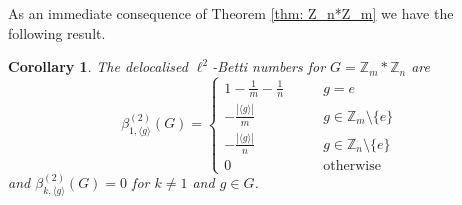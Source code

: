 \documentclass[a4paper,leqno,12pt]{article}
\numberwithin{equation}{section}
\theoremstyle{plain}
\newtheorem{corollary}[theoremcounter]{Corollary}
\newtheorem{lemma}[theoremcounter]{Lemma}
\newtheorem{question}[theoremcounter]{Question}
\theoremstyle{definition}
\theoremstyle{remark}
\newcommand{\Csr}{\mathrm{C}^*_{\text{red}}}
\begin{document}
%	

	As an immediate consequence of Theorem \ref{thm: Z_n*Z_m} we have the following result. 
	
	\begin{corollary} \label{cor: deloc l2 Betti Zn*Zm}
		The delocalised $\ell^2$-Betti numbers for $G = \mathbb Z_m \ast \mathbb Z_n $ are
		\begin{equation*}
			\beta^{(2)}_{1, \langle{g}\rangle}(G) = 
			\begin{cases}
				1-\frac{1}{m}-\frac{1}{n} &\qquad g=e\\
				-\frac{|\langle{g}\rangle|}{m}  &\qquad g \in \mathbb Z_m \setminus \{e\}\\
				-\frac{|\langle{g}\rangle|}{n}  &\qquad g \in \mathbb Z_n \setminus \{e\}\\
				0 \qquad & \qquad  \text{otherwise} 
			\end{cases}
		\end{equation*}
		and $\beta ^{(2)}_{k, \langle{g}\rangle}(G) = 0$ for $k \neq 1$ and $g\in G$.
	\end{corollary}
	
\end{document}
